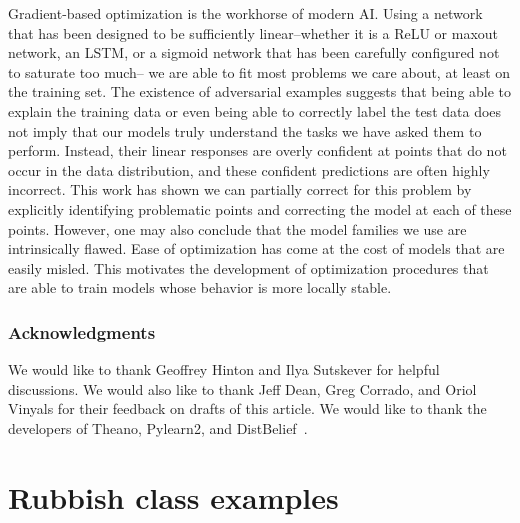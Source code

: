 \documentclass{article} %
\begin{document}
Gradient-based optimization is the workhorse of modern AI. Using a network that has been designed to be sufficiently
linear--whether it is a ReLU or maxout network, an LSTM, or a sigmoid network that has been carefully configured not to saturate too much--
we are able to fit most problems we care about, at least on the training set. The existence of adversarial examples suggests that being
able to explain the training data or even being able to correctly label the test data does not imply that our models truly understand
the tasks we have asked them to perform. Instead, their linear responses are overly confident at points that do not
occur in the data distribution, and these confident predictions are often highly incorrect. This work has shown we can partially correct
for this problem by explicitly identifying problematic points and correcting the model at each of these points. However, one may
also conclude that the model families we use are intrinsically flawed. Ease of optimization has come at the cost of models that are
easily misled. This motivates the development of optimization procedures that are able to train models whose behavior is more locally
stable.

\subsubsection*{Acknowledgments}
We would like to thank Geoffrey Hinton and Ilya Sutskever for helpful discussions. We would also like to thank Jeff Dean, Greg Corrado, and Oriol Vinyals
for their feedback on drafts of this article.
We would like to thank the developers of Theano\citep{bergstra+al:2010-scipy,Bastien-Theano-2012}, Pylearn2\citep{pylearn2_arxiv_2013}, and DistBelief~\citep{distbelief}.

\small
\setlength{\bibsep}{4pt plus 0.3ex}



\appendix
\section{Rubbish class examples}
\end{document}
